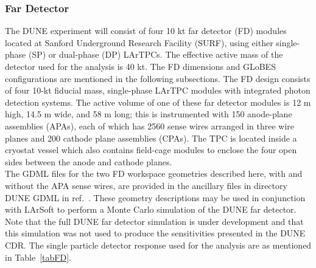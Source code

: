 \subsubsection{Far Detector}
The DUNE experiment will consist of four 10 kt far detector (FD) modules located at Sanford Underground Research Facility (SURF), using either single-phase (SP) or dual-phase (DP) LArTPCs. The effective active mass of the detector used for the analysis is 40 kt. The FD dimensions and GLoBES configurations are mentioned in the following subsections.
The FD design consists of four 10-kt fiducial mass, single-phase LArTPC modules with integrated photon detection systems. The active volume of one of these far detector modules is 12 m high, 14.5 m wide, and 58 m long; this is instrumented with 150 anode-plane assemblies (APAs), each of which has 2560 sense wires
arranged in three wire planes and 200 cathode plane assemblies (CPAs). The TPC is located inside a cryostat vessel which also contains field-cage modules to enclose the four open sides between the anode and cathode planes.\\
The GDML files for the two FD workspace geometries described here, with and without the APA
sense wires, are provided in the ancillary files in directory DUNE GDML in ref.~\cite{Alion:2016uaj}. These geometry descriptions
may be used in conjunction with LArSoft to perform a Monte Carlo simulation of the DUNE far detector. Note that the full DUNE far detector simulation is under development and that this simulation was not used to produce the sensitivities presented in the DUNE CDR.
The single particle detector response used for the analysis are as mentioned in Table~\ref{tabFD}.
\begin{table}[h]
    \begin{center}
        \end{center}
        \caption{\label{tabFD}FD properties used for the analysis }
    \end{table} 
